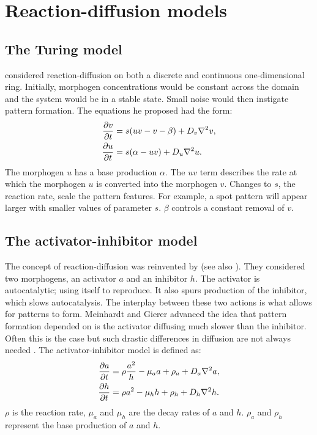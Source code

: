 \section{Reaction-diffusion models}
\subsection{The Turing model}
\citet{turing1952} considered reaction-diffusion on both a discrete and continuous one-dimensional ring. Initially, morphogen concentrations would be constant across the domain and the system would be in a stable state. Small noise would then instigate pattern formation. The equations he proposed had the form:
	\begin{equation}
	\begin{aligned} \label{eq:turingRD}
			\frac{\partial v}{\partial t} &= s(uv-v-\beta) + D_v \nabla^2 v,\\
			\frac{\partial u}{\partial t} &= s(\alpha-uv) + D_u \nabla^2 u.
	\end{aligned}
	\end{equation}
The morphogen $u$ has a base production $\alpha$. The $uv$ term describes the rate at which the morphogen $u$ is converted into the morphogen $v$. Changes to $s$, the reaction rate, scale the pattern features. For example, a spot pattern will appear larger with smaller values of parameter $s$. $\beta$ controls a constant removal of $v$.

\subsection{The activator-inhibitor model}
The concept of reaction-diffusion was reinvented by \citet{gierer1972} (see also \citep{meinhardt1982}). They considered two morphogens, an activator $a$ and an inhibitor $h$. The activator is autocatalytic; using itself to reproduce. It also spurs production of the inhibitor, which slows autocatalysis. The interplay between these two actions is what allows for patterns to form. Meinhardt and Gierer advanced the idea that pattern formation depended on is the activator diffusing much slower than the inhibitor. Often this is the case but such drastic differences in diffusion are not always needed \citep{gray1984, marcon2016}. The activator-inhibitor model is defined as:
	\begin{equation}
	\begin{aligned} \label{eq:activatorInhibitorRD}
			\frac{\partial a}{\partial t} &= \rho \frac{a^2}{h} - \mu_a a + \rho_a + D_a \nabla^2 a,\\
			\frac{\partial h}{\partial t} &= \rho a^2 - \mu_h h  + \rho_h + D_h \nabla^2 h.
	\end{aligned}
	\end{equation}
$\rho$ is the reaction rate, $\mu_a$ and $\mu_h$ are the decay rates of $a$ and $h$. $\rho_a$ and $\rho_h$ represent the base production of $a$ and $h$. 

